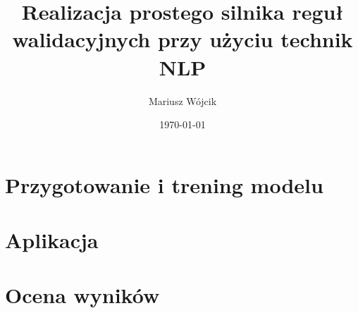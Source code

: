 \documentclass[10pt, a4paper, twoside, titlepage]{report}
\title{Realizacja prostego silnika reguł walidacyjnych przy użyciu technik NLP}
\author{Mariusz Wójcik
}
\date{\today}
\begin{document}
	\maketitle
	
	
 				
	
	
	
   \noindent	
	\part{Przygotowanie i trening modelu}
	
	
	
	
	
	\part{Aplikacja}
	
	
	\part{Ocena wyników}
	
	
%	






	
\end{document}
